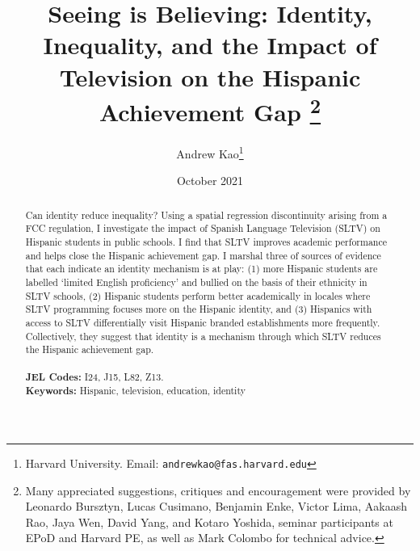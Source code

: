 \documentclass[11pt]{article}
\begin{document}
\title{\textbf{Seeing is Believing: Identity, Inequality, and the Impact of Television on the Hispanic Achievement Gap}%
\thanks{Many appreciated suggestions, critiques and encouragement were provided by Leonardo Bursztyn, Lucas Cusimano, Benjamin Enke, Victor Lima, Aakaash Rao, Jaya Wen, David Yang, and Kotaro Yoshida, seminar participants at EPoD and Harvard PE, as well as Mark Colombo for technical advice. }\\
}



\author{Andrew Kao\thanks{Harvard University. Email: \texttt{andrewkao@fas.harvard.edu}} }

\date{October 2021}
{\vspace{-5ex}}


\maketitle

\begin{abstract}
\noindent  Can identity reduce inequality? Using a spatial regression discontinuity arising from a FCC regulation, I investigate the impact of Spanish Language Television (SLTV) on Hispanic students in public schools. I find that SLTV improves academic performance and helps close the Hispanic achievement gap. I marshal three of sources of evidence that each indicate an identity mechanism is at play: (1) more Hispanic students are labelled `limited English proficiency' and bullied on the basis of their ethnicity in SLTV schools, (2) Hispanic students perform better academically in locales where SLTV programming focuses more on the Hispanic identity, and (3) Hispanics with access to SLTV differentially visit Hispanic branded establishments more frequently. Collectively, they suggest that identity is a mechanism through which SLTV reduces the Hispanic achievement gap.\\\\
\textbf{JEL Codes:} I24, J15, L82, Z13.\\
\textbf{Keywords:} Hispanic, television, education, identity
\end{abstract}




\newsavebox{\tablebox} \newlength{\tableboxwidth}

\setlength{\baselineskip}{22pt}

\renewcommand{\thefootnote}{\fnsymbol{footnote}}
\end{document}
